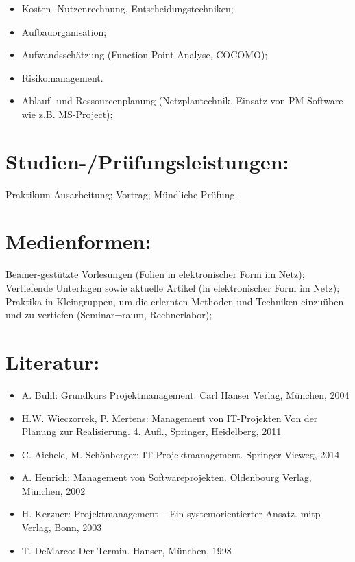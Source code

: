 \begin{itemize}
\tightlist
\item
  Kosten- Nutzenrechnung, Entscheidungstechniken;
\item
  Aufbauorganisation;
\item
  Aufwandsschätzung (Function-Point-Analyse, COCOMO);
\item
  Risikomanagement.
\item
  Ablauf- und Ressourcenplanung (Netzplantechnik, Einsatz von
  PM-Software wie z.B. MS-Project);
\end{itemize}

\section{Studien-/Prüfungsleistungen:}\label{studien-pruxfcfungsleistungen-20}

Praktikum-Ausarbeitung; Vortrag; Mündliche Prüfung.

\section{Medienformen:}\label{medienformen-20}

Beamer-gestützte Vorlesungen (Folien in elektronischer Form im Netz);
Vertiefende Unterlagen sowie aktuelle Artikel (in elektronischer Form im
Netz); Praktika in Kleingruppen, um die erlernten Methoden und Techniken
einzuüben und zu vertiefen (Seminar¬raum, Rechnerlabor);

\section{Literatur:}\label{literatur-20}

\begin{itemize}
\tightlist
\item
  A. Buhl: Grundkurs Projektmanagement. Carl Hanser Verlag, München,
  2004
\item
  H.W. Wieczorrek, P. Mertens: Management von IT-Projekten Von der
  Planung zur Realisierung. 4. Aufl., Springer, Heidelberg, 2011
\item
  C. Aichele, M. Schönberger: IT-Projektmanagement. Springer Vieweg,
  2014
\item
  A. Henrich: Management von Softwareprojekten. Oldenbourg Verlag,
  München, 2002
\item
  H. Kerzner: Projektmanagement -- Ein systemorientierter Ansatz.
  mitp-Verlag, Bonn, 2003
\item
  T. DeMarco: Der Termin. Hanser, München, 1998
\end{itemize}

